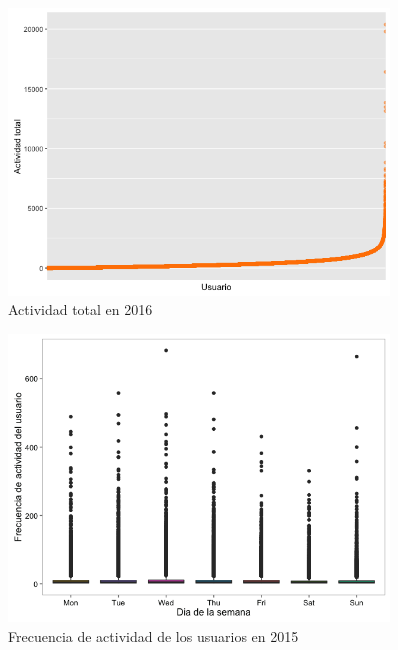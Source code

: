 \begin{figure}[H]
\centering
\includegraphics[width=0.9\textwidth]{../r/actividadtotal_2016}
\caption{Actividad total en 2016}
\label{fig:actividadtotal_2016}
\end{figure}

\begin{figure}[H]
\centering
\includegraphics[width=0.9\textwidth]{../r/frecuenciaactividadusuario_2015}
\caption{Frecuencia de actividad de los usuarios en 2015}
\label{fig:frecuenciaactividadusuario_2015}
\end{figure}

